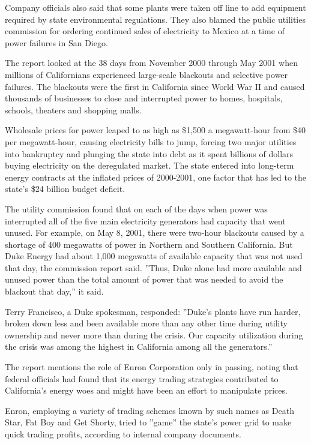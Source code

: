 Company officials also said that some plants were taken off line to add
equipment required by state environmental regulations. They also blamed
the public utilities commission for ordering continued sales of
electricity to Mexico at a time of power failures in San Diego.

The report looked at the 38 days from November 2000 through May 2001
when millions of Californians experienced large-scale blackouts and
selective power failures. The blackouts were the first in California
since World War II and caused thousands of businesses to close and
interrupted power to homes, hospitals, schools, theaters and shopping
malls.

Wholesale prices for power leaped to as high as \$1,500 a megawatt-hour
from \$40 per megawatt-hour, causing electricity bills to jump, forcing
two major utilities into bankruptcy and plunging the state into debt as
it spent billions of dollars buying electricity on the deregulated
market. The state entered into long-term energy contracts at the
inflated prices of 2000-2001, one factor that has led to the state's
\$24 billion budget deficit.

The utility commission found that on each of the days when power was
interrupted all of the five main electricity generators had capacity
that went unused. For example, on May 8, 2001, there were two-hour
blackouts caused by a shortage of 400 megawatts of power in Northern and
Southern California. But Duke Energy had about 1,000 megawatts of
available capacity that was not used that day, the commission report
said. ''Thus, Duke alone had more available and unused power than the
total amount of power that was needed to avoid the blackout that day,''
it said.

Terry Francisco, a Duke spokesman, responded: ''Duke's plants have run
harder, broken down less and been available more than any other time
during utility ownership and never more than during the crisis. Our
capacity utilization during the crisis was among the highest in
California among all the generators.''

The report mentions the role of Enron Corporation only in passing,
noting that federal officials had found that its energy trading
strategies contributed to California's energy woes and might have been
an effort to manipulate prices.

Enron, employing a variety of trading schemes known by such names as
Death Star, Fat Boy and Get Shorty, tried to ''game'' the state's power
grid to make quick trading profits, according to internal company
documents.

